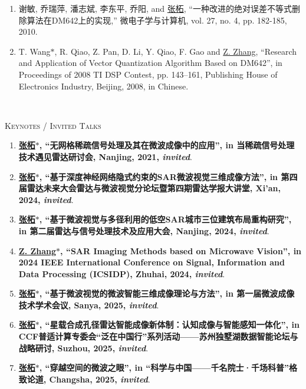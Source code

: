 \documentclass[paper=a4,fontsize=11pt]{scrartcl}
\begin{document}
\begin{enumerate}

\item 谢敏, 乔瑞萍, 潘志斌, 李东平, 乔阳, and \underline{张柘}, ``一种改进的绝对误差不等式删除算法在DM642上的实现,'' 微电子学与计算机, vol. 27, no. 4, pp. 182-185, 2010.

\item T. Wang$\ast$, R. Qiao, Z. Pan, D. Li, Y. Qiao, F. Gao and \underline{Z. Zhang}, ``Research and Application of Vector Quantization Algorithm Based on DM642'', in Proceedings of 2008 TI DSP Contest, pp. 143--161, Publishing House of Electronics Industry, Beijing, 2008, in Chinese. 

~\\

\end{enumerate}

\textsc{Keynotes / Invited Talks}

\begin{enumerate}

\item \textbf{\underline{张柘$\ast$}, ``无网格稀疏信号处理及其在微波成像中的应用'', in 当稀疏信号处理技术遇见雷达研讨会, Nanjing, 2021, \emph{invited}}.

\item \textbf{\underline{张柘$\ast$}, ``基于深度神经网络隐式约束的SAR微波视觉三维成像方法'', in 第四届雷达未来大会雷达与微波视觉分论坛暨第四期雷达学报大讲堂, Xi'an, 2024, \emph{invited}}.

\item \textbf{\underline{张柘$\ast$}, ``基于微波视觉与多径利用的低空SAR城市三位建筑布局重构研究'', in 第二届雷达与信号处理技术及应用大会, Nanjing, 2024, \emph{invited}}.

\item \textbf{\underline{Z. Zhang$\ast$}, ``SAR Imaging Methods based on Microwave Vision'', in 2024 IEEE International Conference on Signal, Information and Data Processing (ICSIDP), Zhuhai, 2024, \emph{invited}}.

\item \textbf{\underline{张柘$\ast$}, ``基于微波视觉的微波智能三维成像理论与方法'', in 第一届微波成像技术学术会议, Sanya, 2025, \emph{invited}}.

\item \textbf{\underline{张柘$\ast$}, ``星载合成孔径雷达智能成像新体制：认知成像与智能感知一体化'', in CCF普适计算专委会``泛在中国行''系列活动——苏州独墅湖数据智能论坛与战略研讨, Suzhou, 2025, \emph{invited}}.

\item \textbf{\underline{张柘$\ast$}, ``穿越空间的微波之眼'', in ``科学与中国——千名院士·千场科普''格致论道, Changsha, 2025, \emph{invited}}.

\end{enumerate}
\end{document}
